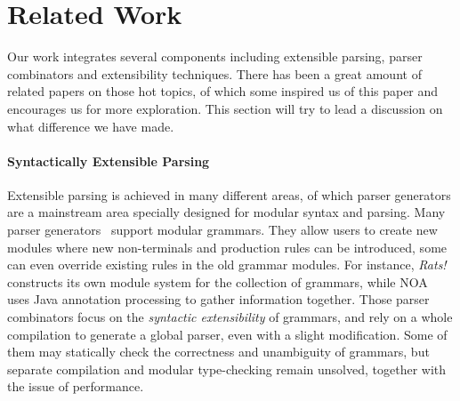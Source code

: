 \section{Related Work}\label{sec:relatedwork}

%
%
%
%

Our work integrates several components including extensible parsing,
parser combinators and extensibility techniques. There has been a
great amount of related papers on those hot topics, of which some
inspired us of this paper and encourages us for more exploration. This
section will try to lead a discussion on what difference we have made.

\paragraph*{Syntactically Extensible Parsing} Extensible parsing is achieved in many
different areas, of which parser generators are a mainstream area
specially designed for modular syntax and parsing. Many parser
generators~\cite{antlr1995,Grimm2006,Gouseti2014,Warth2016} support
modular grammars. They allow users to create new
modules where new non-terminals and production rules can be
introduced, some can even override existing rules in the old grammar
modules. For instance, \textit{Rats!}~\cite{Grimm2006} constructs its
own module system for the collection of grammars, while
NOA~\cite{Gouseti2014} uses Java annotation processing to gather
information together. Those parser combinators focus on the
\textit{syntactic extensibility} of grammars, and rely on a whole
compilation to generate a global parser, even with a slight
modification. Some of them may statically check the correctness and
unambiguity of grammars, but separate compilation and modular
type-checking remain unsolved, together with the issue of performance.

